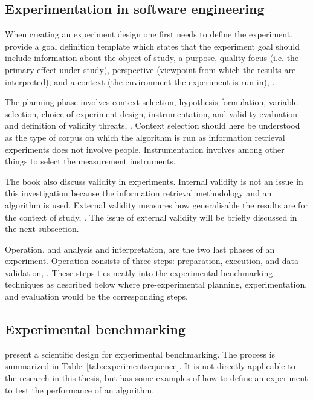 \subsection{Experimentation in software engineering}

When creating an experiment design one first needs to define the experiment. \citeauthor{Wohlin2000} provide a goal definition template which states that the experiment goal should include information about the object of study, a purpose, quality focus (i.e. the primary effect under study), perspective (viewpoint from which the results are interpreted), and a context (the environment the experiment is run in), \parencite{Wohlin2000}.

The planning phase involves context selection, hypothesis formulation, variable selection, choice of experiment design, instrumentation, and validity evaluation and definition of validity threats, \parencite{Wohlin2000}. Context selection should here be understood as the type of corpus on which the algorithm is run as information retrieval experiments does not involve people. Instrumentation involves among other things to select the measurement instruments.

The book also discuss validity in experiments. Internal validity is not an issue in this investigation because the information retrieval methodology and an algorithm is used. External validity measures how generalisable the results are for the context of study, \parencite{Wohlin2000}. The issue of external validity will be briefly discussed in the next subsection.

Operation, and analysis and interpretation, are the two last phases of an experiment. Operation consists of three steps: preparation, execution, and data validation, \parencite{Wohlin2000}. These steps ties neatly into the experimental benchmarking techniques as described below where pre-experimental planning, experimentation, and evaluation would be the corresponding steps.

\subsection{Experimental benchmarking}
\cite{Bartz-Beielstein2004} present a scientific design for experimental benchmarking. The process is summarized in Table~\ref{tab:experimentsequence}. It is not directly applicable to the research in this thesis, but has some examples of how to define an experiment to test the performance of an algorithm.

